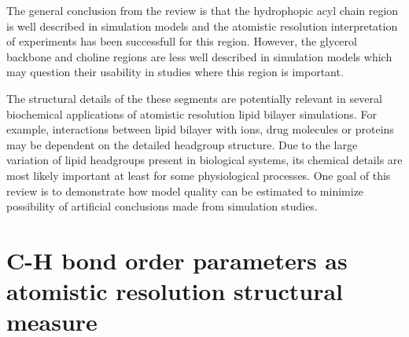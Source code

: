 \documentclass[aps,prl,superscriptaddress,twocolumn]{revtex4}
\begin{document}
The general conclusion from the review is that the hydrophopic acyl chain region is well described
in simulation models and the atomistic resolution interpretation of experiments has been successfull 
for this region. However, the glycerol backbone and choline regions are less well described in simulation models which
may question their usability in studies where this region is important.

The structural details of the these segments are potentially relevant in several biochemical
applications of atomistic resolution lipid bilayer simulations. For example, 
interactions between lipid bilayer with ions, drug molecules or proteins may be dependent
on the detailed headgroup structure. Due to the large variation of lipid headgroups present
in biological systems, its chemical details are most likely important at least for some
physiological processes. One goal of this review is to demonstrate how model quality can 
be estimated to minimize possibility of artificial conclusions made from simulation studies.




\section{C-H bond order parameters as atomistic resolution structural measure}



\end{document}
